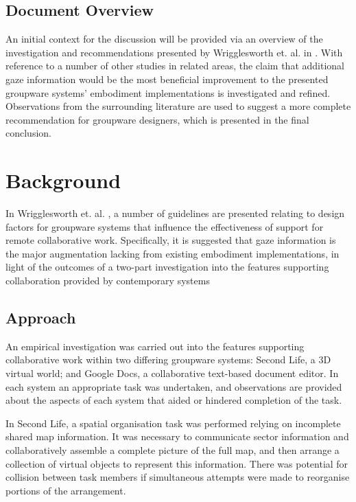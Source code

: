 \documentclass{acm_proc_article-sp}
\begin{document}

\subsection{Document Overview}
An initial context for the discussion will be provided via an overview of the investigation and recommendations presented by Wrigglesworth et. al. in \cite{wrigglesworth2014design}. With reference to a number of other studies in related areas, the claim that additional gaze information would be the most beneficial improvement to the presented groupware systems' embodiment implementations is investigated and refined. Observations from the surrounding literature are used to suggest a more complete recommendation for groupware designers, which is presented in the final conclusion.

\section{Background}

In Wrigglesworth et. al. \cite{wrigglesworth2014design}, a number of guidelines are presented relating to design factors for groupware systems that influence the effectiveness of support for remote collaborative work. Specifically, it is suggested that gaze information is the major augmentation lacking from existing embodiment implementations, in light of the outcomes of a two-part investigation into the features supporting collaboration provided by contemporary systems

\subsection{Approach}
An empirical investigation was carried out into the features supporting collaborative work within two differing groupware systems: Second Life, a 3D virtual world; and Google Docs, a collaborative text-based document editor. In each system an appropriate task was undertaken, and observations are provided about the aspects of each system that aided or hindered completion of the task.

In Second Life, a spatial organisation task was performed relying on incomplete shared map information. It was necessary to communicate sector information and collaboratively assemble a complete picture of the full map, and then arrange a collection of virtual objects to represent this information. There was potential for collision between task members if simultaneous attempts were made to reorganise portions of the arrangement.
\end{document}
